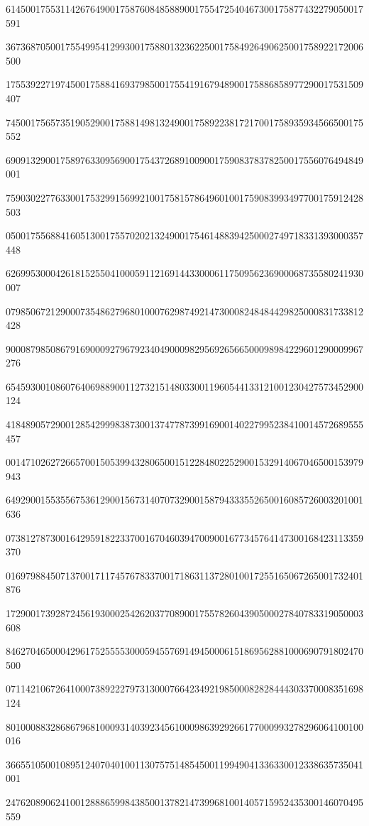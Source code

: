 \documentclass[10pt]{article}
\begin{document}
614500175531142676490017587608485889001755472540467300175877432279050017591\par
367368705001755499541299300175880132362250017584926490625001758922172006500\par
175539227197450017588416937985001755419167948900175886858977290017531509407\par
745001756573519052900175881498132490017589223817217001758935934566500175552\par
690913290017589763309569001754372689100900175908378378250017556076494849001\par
759030227763300175329915699210017581578649601001759083993497700175912428503\par
050017556884160513001755702021324900175461488394250002749718331393000357448\par
626995300042618152550410005911216914433000611750956236900068735580241930007\par
079850672129000735486279680100076298749214730008248484429825000831733812428\par
900087985086791690009279679234049000982956926566500098984229601290009967276\par
654593001086076406988900112732151480330011960544133121001230427573452900124\par
418489057290012854299983873001374778739916900140227995238410014572689555457\par
001471026272665700150539943280650015122848022529001532914067046500153979943\par
649290015535567536129001567314070732900158794333552650016085726003201001636\par
073812787300164295918223370016704603947009001677345764147300168423113359370\par
016979884507137001711745767833700171863113728010017255165067265001732401876\par
172900173928724561930002542620377089001755782604390500027840783319050003608\par
846270465000429617525555300059455769149450006151869562881000690791802470500\par
071142106726410007389222797313000766423492198500082828444303370008351698124\par
801000883286867968100093140392345610009863929266177000993278296064100100016\par
366551050010895124070401001130757514854500119949041336330012338635735041001\par
247620890624100128886599843850013782147399681001405715952435300146070495559\par
\end{document}
